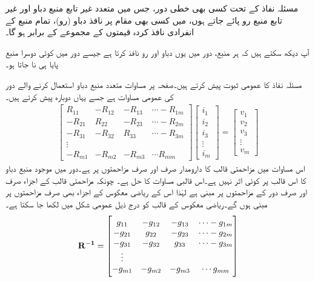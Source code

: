 مسئلہ نفاذ کے تحت کسی بھی خطی دور، جس میں متعدد غیر تابع منبع دباو اور غیر تابع منبع رو پائے جاتے ہوں، میں  کسی بھی مقام پر نافذ دباو (رو)، تمام منبع کے انفرادی نافذ کردہ قیمتوں  کے مجموعے  کے برابر ہو گا۔

آپ دیکھ سکتے ہیں کہ ہر منبع، دور میں یوں دباو اور رو نافذ کرتا ہے جیسے دور میں کوئی دوسرا منبع پایا ہی نا جاتا ہو۔

مسئلہ نفاذ کا عمومی ثبوت پیش کرتے ہیں۔صفحہ  پر مساوات  متعدد منبع دباو استعمال کرنے والے دور کی عمومی مساوات ہے جسے یہاں دوبارہ پیش کرتے ہیں۔
\begin{align}\label{مساوات_جوڑ_عمومی_مساوات_متعدد_منبع_دوبارہ}
\begin{bmatrix}
R_{11} & -R_{12}& -R_{13}& \cdots -R_{1m}\\
-R_{21} & R_{22}& -R_{23}& \cdots -R_{2m}\\
-R_{31} & -R_{32}& R_{33}& \cdots -R_{3m}\\
\vdots\\
-R_{m1}&-R_{m2}&-R_{m3}&\cdots R_{mm}
\end{bmatrix}
\begin{bmatrix}
i_1\\
i_2\\
i_3\\
\vdots\\
i_m
\end{bmatrix}
=
\begin{bmatrix}
v_{1}\\
v_{2}\\
v_{3}\\
\vdots\\
v_{m}
\end{bmatrix}
\end{align}
اس مساوات میں مزاحمتی قالب کا دارومدار صرف اور صرف مزاحمتوں پر ہے۔دور میں موجود منبع دباو کا اس قالب پر کوئی اثر نہیں ہے۔اس قالبی مساوات  کا حل  ہے۔ چونکہ مزاحمتی قالب  کے اجزاء صرف اور صرف دور کے مزاحمتوں پر مبنی ہے لہٰذا اس کے ریاضی معکوس  کے اجزاء بھی صرف مزاحمتوں پر مبنی ہوں گے۔ریاضی معکوس کے قالب کو درج ذیل عمومی شکل میں لکھا جا سکتا ہے۔
\begin{align*}
\bf{R^{-1}}=
\begin{bmatrix}
g_{11} & -g_{12}& -g_{13}& \cdots -g_{1m}\\
-g_{21} & g_{22}& -g_{23}& \cdots -g_{2m}\\
-g_{31} & -g_{32}& g_{33}& \cdots -g_{3m}\\
\vdots\\
-g_{m1}&-g_{m2}&-g_{m3}&\cdots g_{mm}
\end{bmatrix}
\end{align*}
